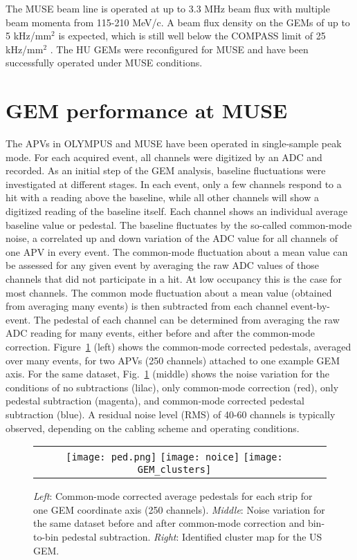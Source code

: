 \documentclass{PoS}
\begin{document}
The MUSE beam line is operated at up to 3.3 MHz beam flux with multiple beam
momenta from 115-210 MeV/c. A beam flux density on the GEMs of up to
5 kHz/mm$^2$ is expected, which is still well below the COMPASS limit of
25 kHz/mm$^2$ \cite{COMPASS}. The HU GEMs were reconfigured for MUSE
and have been successfully operated under MUSE conditions.

\section{GEM performance at MUSE}

The APVs in OLYMPUS and MUSE have been operated in single-sample peak mode.
For each acquired event, all channels were digitized by an ADC and recorded.
As an initial step of the GEM analysis, baseline fluctuations were investigated
at different stages. In each event, only a few channels respond to a hit with
a reading above the baseline, while all other channels will show a digitized
reading of the baseline itself.
Each channel shows an individual average baseline value or pedestal.
The baseline fluctuates by the so-called common-mode noise, a correlated up
and down variation of the ADC value for all channels of one APV in every event.
The common-mode fluctuation about a mean value can be assessed for any given
event by averaging the raw ADC values of those channels that did not
participate in a hit. At low occupancy this is the case for most channels.
The common mode fluctuation about a mean value (obtained from averaging many
events) is then subtracted from each channel event-by-event. The pedestal of
each channel can be determined from averaging the raw ADC reading for many
events, either before and after the common-mode correction.
Figure~\ref{backg} (left) shows the common-mode corrected pedestals, averaged
over many events, for two APVs (250 channels) attached to one example GEM axis.
For the same dataset, Fig.~\ref{backg} (middle) shows the noise variation
for the conditions of no subtractions (lilac), only common-mode correction
(red), only pedestal subtraction (magenta), and common-mode corrected pedestal
subtraction (blue). A residual noise level (RMS) of 40-60 channels is typically
observed, depending on the cabling scheme and operating conditions.

\begin{figure}[b] %
\centering
\begin{tabular}{cc}
\mbox{\texttt{[image: ped.png]}}
\mbox{\texttt{[image: noice]}}
\mbox{\texttt{[image: GEM\_clusters]}}
\end{tabular}
\caption{\emph{Left}: Common-mode corrected average pedestals for each strip
  for one GEM coordinate axis (250 channels).
  \emph{Middle}: Noise variation for the same dataset before and after
  common-mode correction and bin-to-bin pedestal subtraction.
  \emph{Right}: Identified cluster map for the US GEM.} 
\label{backg} 
\end{figure}
\end{document}
